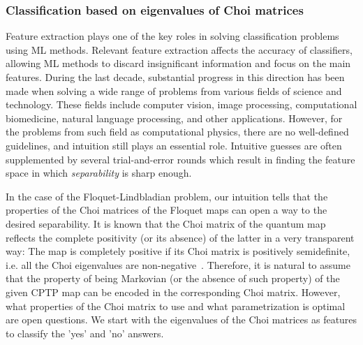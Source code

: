 \documentclass[%
 aip,
 floatfix,
 amsmath,amssymb,
 reprint,%
]{revtex4-1}
\begin{document}
\subsubsection{Classification based on eigenvalues of Choi matrices}
Feature extraction plays one of the key roles in solving classification problems using ML methods. Relevant feature extraction affects the accuracy of classifiers, allowing ML methods to discard insignificant information and focus on the main features. During the last decade, substantial progress in this direction has been made when solving a wide range of problems from various fields of science and technology. These fields include  computer vision, image processing, computational biomedicine, natural language processing, and other applications. However, for the problems from such field as computational physics, there are no well-defined guidelines, and intuition still plays an essential role. Intuitive guesses are often supplemented by several trial-and-error rounds which result in finding the feature space in which \textit{separability} is sharp enough. 


In the case of the Floquet-Lindbladian problem, our intuition tells that the properties of the Choi matrices of the Floquet maps can open a way to the desired separability. It is known that the Choi matrix of the quantum map reflects the complete positivity (or its absence) of the latter in a very transparent way: The map is completely positive if its Choi matrix is positively semidefinite, i.e. all the Choi eigenvalues are non-negative~\cite{duala}. Therefore, it is natural to assume that the property of being Markovian (or the absence of such property) of the given CPTP map can be encoded in the corresponding Choi matrix. However, what properties of the Choi matrix to use and what parametrization is optimal are open questions. We start with the eigenvalues of the Choi matrices as features to classify the 'yes' and 'no' answers. 

\end{document}
